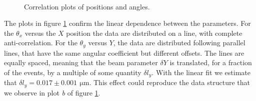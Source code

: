 \begin{figure}[!ht]
\centering
{}
 \\
\caption{Correlation plots of positions and angles.}
\label{fig:CorrelationBeam}
\end{figure}

The plots in figure \ref{fig:CorrelationBeam} confirm the linear dependence between the parameters. For the $\theta_{x}$ versus the $X$ position the data are distributed on a line, with complete anti-correlation. For the $\theta_{y}$ versus $Y$, the data are distributed following parallel lines, that have the same angular coefficient but different offsets. The lines are equally spaced, meaning that the beam parameter $\delta Y$ is translated, for a fraction of the events, by a multiple of some quantity $\delta l_{y}$. With the linear fit we estimate that $\delta l_{y} = 0.017 \pm 0.001 \, \SI{}{\micro \meter}$. This effect could reproduce the data structure that we observe in plot \textit{b} of figure \ref{fig:CorrelationBeam}. 

